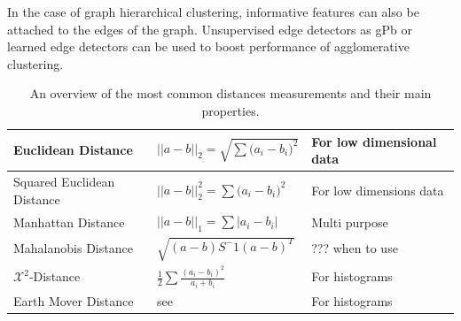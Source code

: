 In the case of graph hierarchical clustering, informative features
can also be attached to the edges of the graph.
Unsupervised edge detectors as gPb \citep{marie_2008_cvpr}  or learned
edge detectors \cite{dollar_2013_iccv}  can be used to boost performance
of agglomerative clustering.









\begin{table}
\begin{scriptsize}
\begin{tabular}{ |l|l|p{5cm}|}
    \hline 
    Euclidean Distance
        & $||a-b||_2 = \sqrt{\sum{ (a_i-b_i })^2 } $
        & For low dimensional data \\  \hline 
    Squared Euclidean Distance
        & $||a-b||_2^2 = \sum{ (a_i-b_i })^2  $
        & For low dimensions data\\  \hline
    Manhattan Distance
        &  $||a-b||_1 = \sum{ |a_i-b_i |}  $
        & Multi purpose \\  \hline 
    Mahalanobis Distance 
        & $\sqrt{(a-b)S^-1(a-b)^T}$
        & ??? when to use \\  \hline 
    $\mathcal{X}^2$-Distance  
        &  $\frac{1}{2}\sum{  \frac{(a_i-b_i)^2}{a_i+b_i} }$
        & For histograms \\  \hline 
    Earth Mover  Distance          
        &  see \citet{levina_2001_iccv} 
        & For histograms \\  \hline 

\end{tabular}

\end{scriptsize}
\caption{
    An overview of the most common distances measurements and their main properties.
}\label{tab:hc_distance_types}
\end{table}



